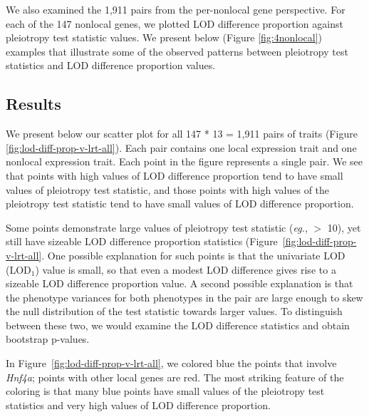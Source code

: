 \documentclass[oneside]{book}
\begin{document}
We also examined the 1,911 pairs from the per-nonlocal gene perspective. For each of the 147 nonlocal genes, we plotted LOD difference proportion against pleiotropy test statistic values. We present below (Figure \ref{fig:4nonlocal}) examples that illustrate some of the observed patterns between pleiotropy test statistics and LOD difference proportion values.


\subsection{Results}


We present below our scatter plot for all 147 * 13 = 1,911 pairs of traits (Figure \ref{fig:lod-diff-prop-v-lrt-all}). Each pair contains one local expression trait and one nonlocal expression trait. Each point in the figure represents a single pair. We see that points with high values of LOD difference proportion tend to have small values of pleiotropy test statistic, and those points with high values of the pleiotropy test statistic tend to have small values of LOD difference proportion. 

Some points demonstrate large values of pleiotropy test statistic (\emph{eg.}, $>$ 10), yet still have sizeable LOD difference proportion statistics (Figure~\ref{fig:lod-diff-prop-v-lrt-all}. One possible explanation for such points is that the univariate LOD (LOD$_1$) value is small, so that even a modest LOD difference gives rise to a sizeable LOD difference proportion value. A second possible explanation is that the phenotype variances for both phenotypes in the pair are large enough to skew the null distribution of the test statistic towards larger values. To distinguish between these two, we would examine the LOD difference statistics and obtain bootstrap p-values.

In Figure~\ref{fig:lod-diff-prop-v-lrt-all}, we colored blue the points that involve \emph{Hnf4a}; points with other local genes are red. The most striking feature of the coloring is that many blue points have small values of the pleiotropy test statistics and very high values of LOD difference proportion.
\end{document}
